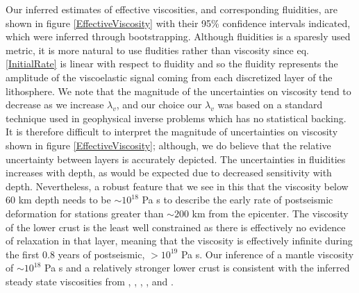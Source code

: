 \documentclass[12pt]{article}
\begin{document}
Our inferred estimates of effective viscosities, and corresponding fluidities, are shown in figure \ref{EffectiveViscosity} with their 95\% confidence intervals indicated, which were inferred through bootstrapping. Although fluidities is a sparesly used metric, it is more natural to use fludities rather than viscosity since eq. \ref{InitialRate} is linear with respect to fluidity and so the fluidity represents the amplitude of the viscoelastic signal coming from each discretized layer of the lithosphere.  We note that the magnitude of the uncertainties on viscosity tend to decrease as we increase $\lambda_v$, and our choice our $\lambda_v$ was based on a standard technique used in geophysical inverse problems which has no statistical backing.  It is therefore difficult to interpret the magnitude of uncertainties on viscosity shown in figure \ref{EffectiveViscosity}; although, we do believe that the relative uncertainty between layers is accurately depicted.  The uncertainties in fluidities increases with depth, as would be expected due to decreased sensitivity with depth.  Nevertheless, a robust feature that we see in this that the viscosity below 60 km depth needs to be $\sim 10^{18}$ Pa s to describe the early rate of postseismic deformation for stations greater than $\sim 200$ km from the epicenter. The viscosity of the lower crust is the least well constrained as there is effectively no evidence of relaxation in that layer, meaning that the viscosity is effectively infinite during the first 0.8 years of postseismic, $> 10^{19}$ Pa s. Our inference of a mantle viscosity of $\sim 10^{18}$ Pa s and a relatively stronger lower crust is consistent with the inferred steady state viscosities from \cite{Pollitz2000}, \cite{Pollitz2003}, \cite{Johnson2007}, \cite{Spinler2015}, and \cite{Rollins2015}.  
\end{document}
